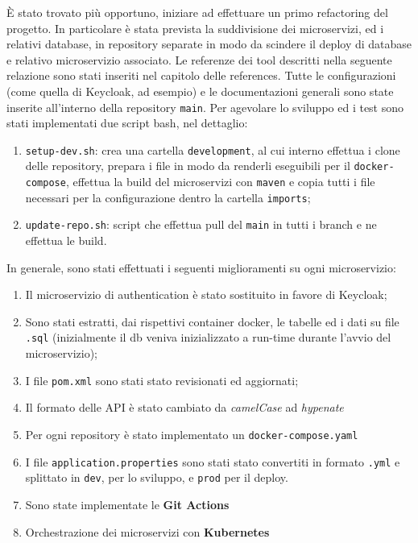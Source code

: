 \documentclass{article}
\begin{document}
È stato trovato più opportuno, iniziare ad effettuare un primo refactoring del progetto.
In particolare è stata prevista la suddivisione dei microservizi, ed i relativi database, in repository separate in modo da scindere il deploy di database e relativo microservizio associato.
Le referenze dei tool descritti nella seguente relazione sono stati inseriti nel capitolo delle references.
Tutte le configurazioni (come quella di Keycloak, ad esempio) e le documentazioni generali sono state inserite all’interno della repository \texttt{main}. Per agevolare lo sviluppo ed i test sono stati implementati due script bash, nel dettaglio:

\begin{enumerate}
    \item {\texttt{setup-dev.sh}: crea una cartella \texttt{development}, al cui interno effettua i clone delle repository, prepara i file in modo da renderli eseguibili per il \texttt{docker-compose}, effettua la build del microservizi con \texttt{maven} e
        copia tutti i file necessari per la configurazione  dentro la cartella \texttt{imports}};
    \item {\texttt{update-repo.sh}: script che effettua pull del \texttt{main} in tutti i branch e ne effettua le build}.
\end{enumerate}

In generale, sono stati effettuati i seguenti miglioramenti su ogni microservizio:

\begin{enumerate}
    \item {Il microservizio di authentication è stato sostituito in favore di Keycloak; }
    \item {Sono stati estratti, dai rispettivi container docker, le tabelle ed i dati su file \texttt{.sql} (inizialmente il db veniva inizializzato a run-time durante l'avvio del microservizio);}
    \item {I file \texttt{pom.xml} sono stati stato revisionati ed aggiornati;}
    \item {Il formato delle API è stato cambiato da \textit{camelCase} ad \textit{hypenate}}
    \item {Per ogni repository è stato implementato un \texttt{docker-compose.yaml}}
    \item {I file \texttt{application.properties} sono stati stato convertiti in formato \texttt{.yml} e splittato in \texttt{dev}, per lo sviluppo, e \texttt{prod} per il deploy.}
    \item {Sono state implementate le \textbf{Git Actions} }
    \item {Orchestrazione dei microservizi con \textbf{Kubernetes}}
\end{enumerate}
\end{document}
